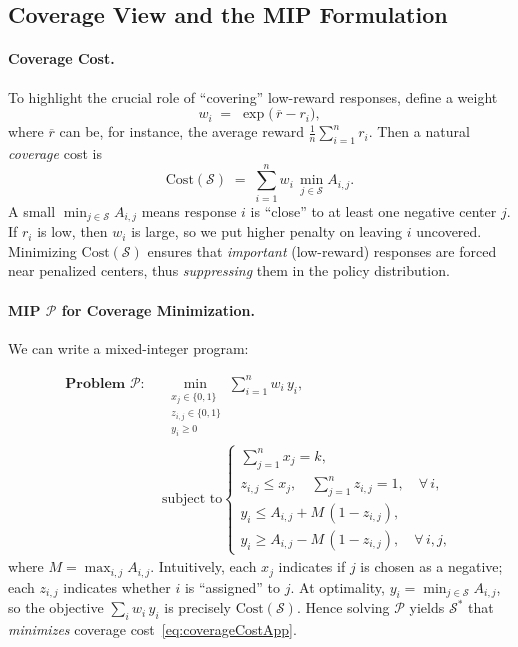 \subsection{Coverage View and the MIP Formulation}

\paragraph{Coverage Cost.}
To highlight the crucial role of ``covering'' low-reward responses, define a weight
\begin{equation}
\label{eq:appWeightDef}
w_i 
\;=\;
\exp\bigl(\,\overline{r} - r_i\bigr),
\end{equation}
where \(\overline{r}\) can be, for instance, the average reward \(\frac{1}{n}\sum_{i=1}^n r_i\). 
Then a natural \emph{coverage} cost is
\begin{equation}
\label{eq:coverageCostApp}
\mathrm{Cost}(\mathcal{S})
\;=\;
\sum_{i=1}^n
  w_i
  \,\min_{j\in \mathcal{S}}
    A_{i,j}.
\end{equation}
A small \(\min_{j\in \mathcal{S}} A_{i,j}\) means response \(i\) is ``close'' to at least one negative center \(j\). If \(r_i\) is low, then \(w_i\) is large, so we put higher penalty on leaving \(i\) uncovered. Minimizing \(\mathrm{Cost}(\mathcal{S})\) ensures that \emph{important} (low-reward) responses are forced near penalized centers, thus \emph{suppressing} them in the policy distribution.

\paragraph{MIP \(\mathcal{P}\) for Coverage Minimization.}

We can write a mixed-integer program:

\begin{align}
\label{eq:covMIPApp}
\nonumber
\textbf{Problem } \mathcal{P}:\;
&\min_{\,\substack{x_j \in \{0,1\}\\ z_{i,j}\in \{0,1\}\\ y_i \ge 0}} 
\sum_{i=1}^n 
  w_i\,y_i,
\\
&\text{subject to}
\begin{cases}
\displaystyle
\sum_{j=1}^n x_j = k, 
\\[0.2em]
z_{i,j}\le x_j,\quad 
\sum_{j=1}^n z_{i,j} = 1,\quad \forall\,i,
\\[0.2em]
y_i\le A_{i,j} + M\,(1 - z_{i,j}),
\\[0.2em]
y_i\ge A_{i,j} - M\,(1 - z_{i,j}),\quad \forall\,i,j,
\end{cases}
\end{align}
where \(M = \max_{i,j} A_{i,j}\). Intuitively, each \(x_j\) indicates if \(j\) is chosen as a negative; each \(z_{i,j}\) indicates whether \(i\) is ``assigned'' to \(j\). At optimality, \(y_i = \min_{j\in \mathcal{S}} A_{i,j}\), so the objective 
\(\sum_i w_i\,y_i\) is precisely \(\mathrm{Cost}(\mathcal{S})\). Hence solving \(\mathcal{P}\) yields \(\mathcal{S}^*\) that \emph{minimizes} coverage cost~\eqref{eq:coverageCostApp}.

